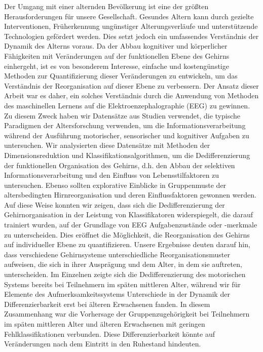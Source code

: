 Der Umgang mit einer alternden Bevölkerung ist eine der größten Herausforderungen für unsere Gesellschaft. Gesundes Altern kann durch gezielte Interventionen, Früherkennung ungünstiger Alterungsverläufe und unterstützende Technologien gefördert werden. Dies setzt jedoch ein umfassendes Verständnis der Dynamik des Alterns voraus. Da der Abbau kognitiver und körperlicher Fähigkeiten mit Veränderungen auf der funktionellen Ebene des Gehirns einhergeht, ist es von besonderem Interesse, einfache und kostengünstige Methoden zur Quantifizierung dieser Veränderungen zu entwickeln, um das Verständnis der Reorganisation auf dieser Ebene zu verbessern. Der Ansatz dieser Arbeit war es daher, ein solches Verständnis durch die Anwendung von Methoden des maschinellen Lernens auf die Elektroenzephalographie (EEG) zu gewinnen.\\
Zu diesem Zweck haben wir Datensätze aus Studien verwendet, die typische Paradigmen der Altersforschung verwenden, um die Informationsverarbeitung während der Ausführung motorischer, sensorischer und kognitiver Aufgaben zu untersuchen. Wir analysierten diese Datensätze mit Methoden der Dimensionsreduktion und Klassifikationsalgorithmen, um die Dedifferenzierung der funktionellen Organisation des Gehirns, d.h. den Abbau der selektiven Informationsverarbeitung und den Einfluss von Lebensstilfaktoren zu untersuchen. Ebenso sollten explorative Einblicke in Gruppenmuste der altersbedingten Hirnreorganisation und deren Einflussfaktoren gewonnen werden.\\
Auf diese Weise konnten wir zeigen, dass sich die Dedifferenzierung der Gehirnorganisation in der Leistung von Klassifikatoren widerspiegelt, die darauf trainiert wurden, auf der Grundlage von EEG Aufgabenzustände oder -merkmale zu unterscheiden. Dies eröffnet die Möglichkeit, die Reorganisation des Gehirns auf individueller Ebene zu quantifizieren. Unsere Ergebnisse deuten darauf hin, dass verschiedene Gehirnsysteme unterschiedliche Reorganisationsmuster aufweisen, die sich in ihrer Ausprägung und dem Alter, in dem sie auftreten, unterscheiden. Im Einzelnen zeigte sich die Dedifferenzierung des motorischen Systems bereits bei Teilnehmern im späten mittleren Alter, während wir für Elemente des Aufmerksamkeitssystems Unterschiede in der Dynamik der Differenzierbarkeit erst bei älteren Erwachsenen fanden. In diesem Zusammenhang war die Vorhersage der Gruppenzugehörigkeit bei Teilnehmern im späten mittleren Alter und älteren Erwachsenen mit geringen Fehlklassifikationen verbunden. Diese Differenzierbarkeit könnte auf Veränderungen nach dem Eintritt in den Ruhestand hindeuten.\\

